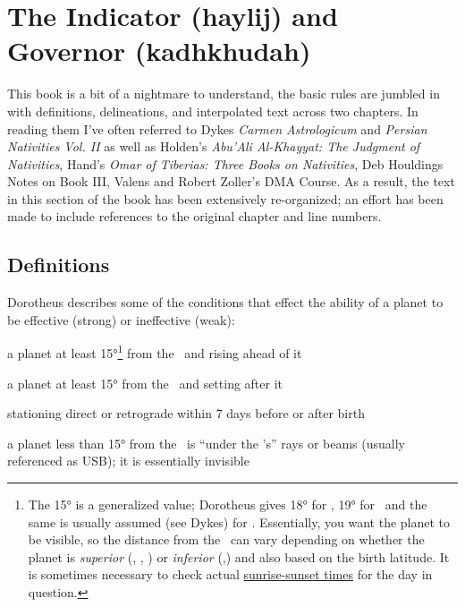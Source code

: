 \section{The Indicator (haylij) and Governor (kadhkhudah)}
\begin{mdframed}[backgroundcolor=cyan!5, rightmargin=1em, leftmargin=1em]
This  book is a bit of a nightmare to understand, the basic rules are jumbled in with definitions, delineations, and interpolated text across two chapters. In reading them I've often referred to Dykes \textsl{Carmen Astrologicum} and \textsl{Persian Nativities Vol. II} as well as Holden's \textsl{Abu'Ali Al-Khayyat: The Judgment of Nativities}, Hand's \textsl{Omar of Tiberias: Three Books on Nativities}, Deb Houldings Notes on Book III, Valens and Robert Zoller's DMA Course. As a result, the text in this section of the book has been extensively re-organized; an effort has been made to include references to the original chapter and line numbers.
\end{mdframed}

\subsection{Definitions}
Dorotheus describes some of the conditions that effect the ability of a planet to be effective (strong) or ineffective (weak):
\begin{description}[style=multiline,leftmargin=7em]
\item[Eastern]a planet at least 15°\footnote{The 15° is a generalized value; Dorotheus gives 18° for \Mars, 19° for \Mercury\, and the same is usually assumed (see Dykes) for \Venus. Essentially, you want the planet to be visible, so the distance from the \Sun\, can vary depending on whether the planet is \textsl{superior} (\Saturn, \Jupiter, \Mars) or \textsl{inferior} (\Venus,\Mercury) and also based on the birth latitude. It is sometimes necessary to check actual \href{https://www.sunrise-and-sunset.com/en/sun}{sunrise-sunset times} for the day in question.} from the \Sun\, and rising ahead of it
\item[Western ]a planet at least 15° from the \Sun\, and setting after it
\item[Station] stationing direct or retrograde within 7 days before or after birth
\item[USB] a planet less than 15° from the \Sun\, is ``under the \Sun's'' rays or beams (usually referenced as USB); it is essentially invisible
\end{description}

